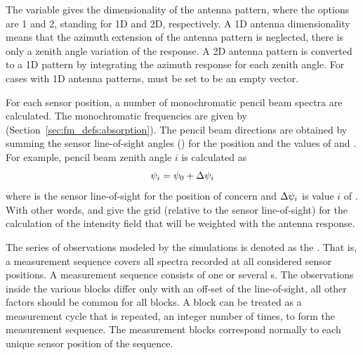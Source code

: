 The variable  gives the dimensionality of the
antenna pattern, where the
options are 1 and 2, standing for 1D and 2D, respectively. A 1D
antenna dimensionality means that the azimuth extension of the
antenna pattern is neglected, there is only a zenith angle variation
of the response. A 2D antenna pattern is converted to a 1D pattern by
integrating the azimuth response for each zenith angle. For cases
with 1D antenna patterns,  must be set to
be an empty vector.

For each sensor position, a number of monochromatic pencil beam
spectra are calculated. The monochromatic frequencies are given by
 (Section~\ref{sec:fm_defs:absorption}). The pencil
beam directions are obtained by summing the sensor line-of-sight
angles () for the position and the values of
 and . For
example, pencil beam zenith angle $i$ is calculated as
\begin{equation}
  \psi_{i} = \psi_{0} + \Delta\psi_{i}
  \label{eq:fm_defs:psi_grid}
\end{equation}
where  is the sensor line-of-sight for the position of
concern and $\Delta\psi_{i}$ is value $i$ of
.  With other words,
 and  give
the grid (relative to the sensor line-of-sight) for the calculation of
the intensity field that will be weighted with the antenna response.


\label{sec:fm_defs:seqsandblocks}

The series of observations modeled by the simulations is denoted as
the . That is, a measurement sequence
covers all spectra recorded at all considered sensor positions. A
measurement sequence consists of one or several s. The observations inside the various blocks differ only with
an off-set of the line-of-sight, all other factors should be common
for all blocks. A block can be treated as a measurement cycle that is
repeated, an integer number of times, to form the measurement
sequence.  The measurement blocks correspond normally to each unique
sensor position of the sequence.


